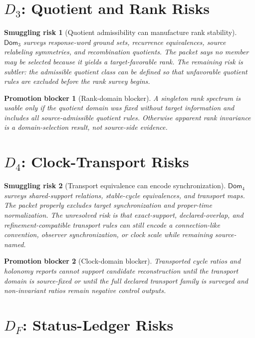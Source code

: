 \documentclass[11pt]{article}
\newcommand{\Dom}{\mathsf{Dom}}
\newtheorem{smugglingrisk}{Smuggling risk}
\newtheorem{promotionblocker}{Promotion blocker}
\begin{document}
\section{\texorpdfstring{\(D_3\)}{D3}: Quotient and Rank Risks}

\begin{smugglingrisk}[Quotient admissibility can manufacture rank stability]
\(\Dom_3\) surveys response-word ground sets, recurrence equivalences,
source relabeling symmetries, and recombination quotients. The packet says no
member may be selected because it yields a target-favorable rank. The
remaining risk is subtler: the admissible quotient class can be defined so
that unfavorable quotient rules are excluded before the rank survey begins.
\end{smugglingrisk}

\begin{promotionblocker}[Rank-domain blocker]
A singleton rank spectrum is usable only if the quotient domain was fixed
without target information and includes all source-admissible quotient rules.
Otherwise apparent rank invariance is a domain-selection result, not
source-side evidence.
\end{promotionblocker}

\section{\texorpdfstring{\(D_4\)}{D4}: Clock-Transport Risks}

\begin{smugglingrisk}[Transport equivalence can encode synchronization]
\(\Dom_4\) surveys shared-support relations, stable-cycle equivalences, and
transport maps. The packet properly excludes target synchronization and
proper-time normalization. The unresolved risk is that exact-support,
declared-overlap, and refinement-compatible transport rules can still encode
a connection-like convention, observer synchronization, or clock scale while
remaining source-named.
\end{smugglingrisk}

\begin{promotionblocker}[Clock-domain blocker]
Transported cycle ratios and holonomy reports cannot support candidate
reconstruction until the transport domain is source-fixed or until the full
declared transport family is surveyed and non-invariant ratios remain
negative control outputs.
\end{promotionblocker}

\section{\texorpdfstring{\(D_F\)}{DF}: Status-Ledger Risks}
\end{document}

